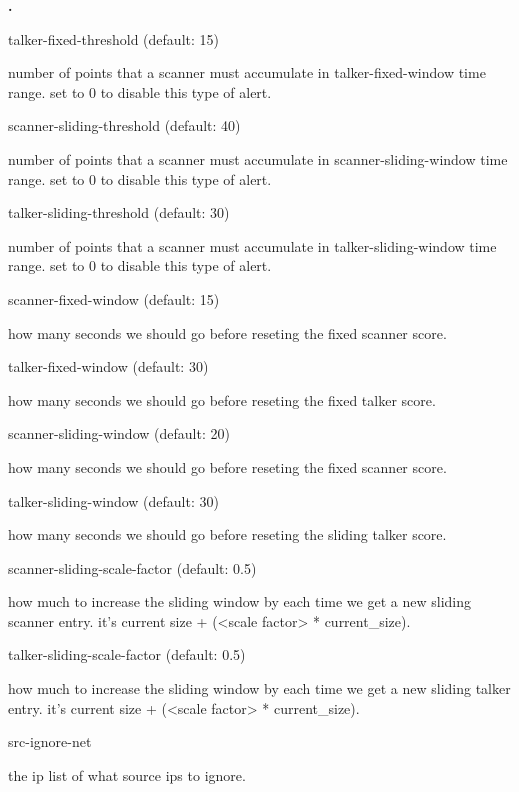 \documentclass[english]{report}
\newcounter{slistnum}
\newenvironment{slist}{
    \begin{list}{
        {
            \bf \arabic{slistnum}.
        } 
    }{
        \usecounter{slistnum} 
    }
}{
    \end{list} 
}
\begin{document}
\begin{slist}
\item talker-fixed-threshold (default: 15)

number of points that a scanner must accumulate in talker-fixed-window time
range. set to 0 to disable this type of alert. 

\item scanner-sliding-threshold (default: 40)

number of points that a scanner must accumulate in scanner-sliding-window time
range. set to 0 to disable this type of alert.

\item talker-sliding-threshold (default: 30)

number of points that a scanner must accumulate in talker-sliding-window time
range. set to 0 to disable this type of alert.

\item scanner-fixed-window (default: 15)

how many seconds we should go before reseting the fixed scanner score.

\item talker-fixed-window (default: 30)

how many seconds we should go before reseting the fixed talker score.

\item scanner-sliding-window (default: 20)

how many seconds we should go before reseting the fixed scanner score.

\item talker-sliding-window (default: 30)

how many seconds we should go before reseting the sliding talker score.

\item scanner-sliding-scale-factor (default: 0.5)

how much to increase the sliding window by each time we get a new sliding
scanner entry.  it's current size + (<scale factor> * current\_size). 

\item talker-sliding-scale-factor (default: 0.5)

how much to increase the sliding window by each time we get a new sliding
talker entry.  it's current size + (<scale factor> * current\_size). 

\item src-ignore-net

the ip list of what source ips to ignore.


\end{slist}
\end{document}
